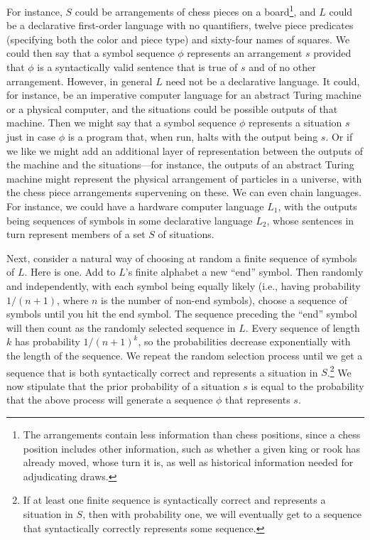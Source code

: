For instance, $S$ could be arrangements of chess pieces on a board\footnote{The arrangements contain less information
than chess positions, since a chess position includes other information, such as whether a given king or rook has already
moved, whose turn it is, as well as historical information needed for adjudicating draws.}, and $L$ could be a declarative 
first-order language with no quantifiers, twelve piece predicates (specifying both the color and piece type) and sixty-four names of squares.
We could then say that a symbol sequence $\phi$ represents an arrangement $s$ provided that $\phi$ is a 
syntactically valid sentence that is true of $s$ and of no other arrangement. However, in general $L$ need not be a declarative
language. It could, for instance, be an imperative computer language for an abstract Turing machine or a physical computer,
and the situations could be possible outputs of that machine. Then we might say that a symbol sequence $\phi$ represents
a situation $s$ just in case $\phi$ is a program that, when run, halts with the output being $s$. Or if we like we might 
add an additional layer of representation between the outputs of the machine and the situations---for instance, the outputs
of an abstract Turing machine might represent the physical arrangement of particles in a universe, with the chess 
piece arrangements supervening on these.  
We can even chain languages. For instance, we could have a hardware  computer language $L_1$, with the outputs being sequences of
symbols in some declarative language $L_2$, whose sentences in turn represent members of a set $S$ of situations.

Next, consider a natural way of choosing at random a finite sequence of symbols of $L$. Here is one. Add to $L$'s finite alphabet 
a new ``end'' symbol. Then randomly and independently, with each symbol being equally likely (i.e., having probability
$1/(n+1)$, where $n$ is the number of non-end symbols), choose a sequence of
symbols until you hit the end symbol. The sequence preceding the ``end'' symbol will then count as the randomly
selected sequence in $L$. Every sequence of length $k$ has probability $1/(n+1)^k$, so the probabilities decrease 
exponentially with the length of the sequence. We repeat the random selection process until we get a sequence that is both syntactically correct
and represents a situation in $S$.\footnote{If at least one finite sequence is syntactically correct and represents a 
situation in $S$, then with probability one, we will eventually get to a sequence that syntactically correctly represents some 
sequence.}  We now stipulate that the prior probability of a situation $s$ is equal to the probability that the
above process will generate a sequence $\phi$ that represents $s$.

